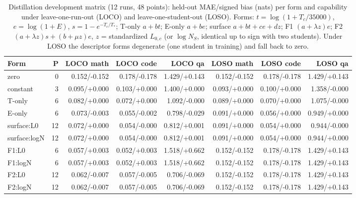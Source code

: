 \begin{table}[H]\centering\scriptsize\setlength{\tabcolsep}{2pt}
\begin{tabular}{@{}lrrrrrrr@{}}
\toprule
Form & P & LOCO math & LOCO code & LOCO qa & LOSO math & LOSO code & LOSO qa \\
\midrule
zero & 0 & 0.152/-0.152 & 0.178/-0.178 & 1.429/+0.143 & 0.152/-0.152 & 0.178/-0.178 & 1.429/+0.143 \\
constant & 3 & 0.095/+0.000 & 0.103/+0.000 & 1.400/+0.000 & 0.093/+0.000 & 0.100/+0.000 & 1.358/-0.000 \\
T-only & 6 & 0.082/+0.000 & 0.072/+0.000 & 1.092/-0.000 & 0.089/+0.000 & 0.070/+0.000 & 1.075/-0.000 \\
E-only & 6 & 0.073/-0.003 & 0.055/-0.002 & 0.798/-0.029 & 0.091/+0.000 & 0.056/+0.000 & 0.949/+0.000 \\
surface:L0 & 12 & 0.072/+0.000 & 0.054/-0.000 & 0.812/+0.001 & 0.091/+0.000 & 0.054/+0.000 & 0.944/-0.000 \\
surface:logN & 12 & 0.072/+0.000 & 0.054/-0.000 & 0.812/+0.001 & 0.091/+0.000 & 0.054/+0.000 & 0.944/+0.000 \\
F1:L0 & 6 & 0.057/+0.003 & 0.052/+0.003 & 1.518/+0.662 & 0.152/-0.152 & 0.178/-0.178 & 1.429/+0.143 \\
F1:logN & 6 & 0.057/+0.003 & 0.052/+0.003 & 1.518/+0.662 & 0.152/-0.152 & 0.178/-0.178 & 1.429/+0.143 \\
F2:L0 & 12 & 0.062/-0.007 & 0.057/-0.005 & 0.706/-0.069 & 0.152/-0.152 & 0.178/-0.178 & 1.429/+0.143 \\
F2:logN & 12 & 0.062/-0.007 & 0.057/-0.005 & 0.706/-0.069 & 0.152/-0.152 & 0.178/-0.178 & 1.429/+0.143 \\
\bottomrule\end{tabular}
\caption{Distillation development matrix (12 runs, 48 points): held-out MAE/signed bias (nats) per form and capability under leave-one-run-out (LOCO) and leave-one-student-out (LOSO). Forms: $t=\log(1+T_c/35000)$, $e=\log(1+E)$, $s=1-e^{-T_c/T_*}$; T-only $a+bt$; E-only $a+be$; surface $a+bt+ce+dz$; F1 $(a+\lambda z)e$; F2 $(a+\lambda z)s+(b+\mu z)e$, $z$ = standardized $L_{0,c}$ (or $\log N_S$, identical up to sign with two students). Under LOSO the descriptor forms degenerate (one student in training) and fall back to zero.}
\label{tab:v56_forms}\end{table}
